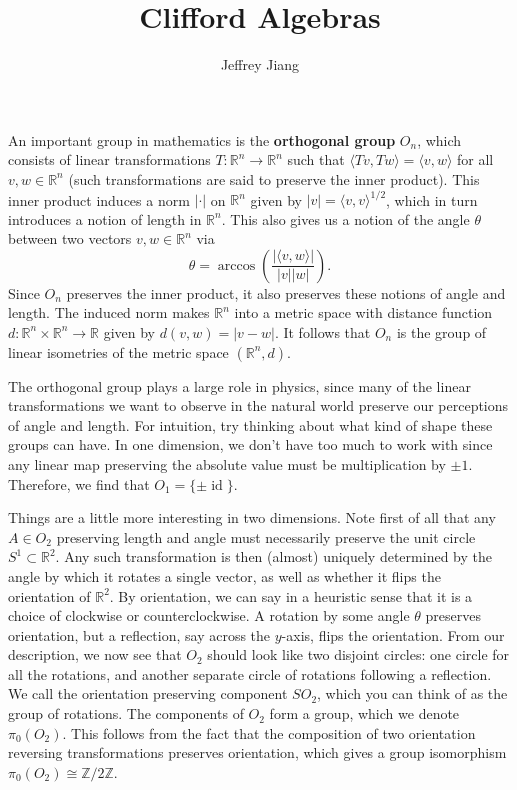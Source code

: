 \documentclass{article}
\newcommand{\R}{\mathbb{R}}
\newcommand{\Z}{\mathbb{Z}}
\DeclareMathOperator{\id}{id}
\begin{document}
\title{Clifford Algebras}
\author{Jeffrey Jiang}
\date{}
\maketitle
%
An important group in mathematics is the \textbf{orthogonal group} $O_n$, which consists of linear transformations $T: \R^n \to \R^n$ such that $\langle Tv, Tw \rangle = \langle v, w \rangle$ for all $v, w \in \R^n$ (such transformations are said to preserve the inner product). This inner product induces a norm $| \cdot |$ on $\R^n$ given by $|v| = \langle v,v \rangle^{1/2}$, which in turn introduces a notion of length in $\R^n$. This also gives us a notion of the angle $\theta$ between two vectors $v,w \in \R^n$ via
$$\theta = \arccos\left( \frac{|\langle v,w \rangle|}{|v| |w|} \right).$$
Since $O_n$ preserves the inner product, it also preserves these notions of angle and length. The induced norm makes $\R^n$ into a metric space with distance function $d : \R^n \times \R^n \to \R$ given by $d(v,w) = |v - w|$. It follows that $O_n$ is the group of linear isometries of the metric space $(\R^n, d)$. 

The orthogonal group plays a large role in physics, since many of the linear transformations we want to observe in the natural world preserve our perceptions of angle and length. For intuition, try thinking about what kind of shape these groups can have. In one dimension, we don't have too much to work with since any linear map preserving the absolute value must be multiplication by $\pm 1$. Therefore, we find that $O_1 = \{\pm \id\}$. 

Things are a little more interesting in two dimensions. Note first of all that any $A \in O_2$ preserving length and angle must necessarily preserve the unit circle $S^1 \subset \R^2$. Any such transformation is then (almost) uniquely determined by the angle by which it rotates a single vector, as well as whether it flips the orientation of $\R^2$. By orientation, we can say in a heuristic sense that it is a choice of clockwise or counterclockwise. A rotation by some angle $\theta$ preserves orientation, but a reflection, say across the $y$-axis, flips the orientation. From our description, we now see that $O_2$ should look like two disjoint circles: one circle for all the rotations, and another separate circle of rotations following a reflection. We call the orientation preserving component $SO_2$, which you can think of as the group of rotations. The components of $O_2$ form a group, which we denote $\pi_0(O_2)$. This follows from the fact that the composition of two orientation reversing transformations preserves orientation, which gives a group isomorphism $\pi_0(O_2) \cong \Z / 2\Z$.
\end{document}
